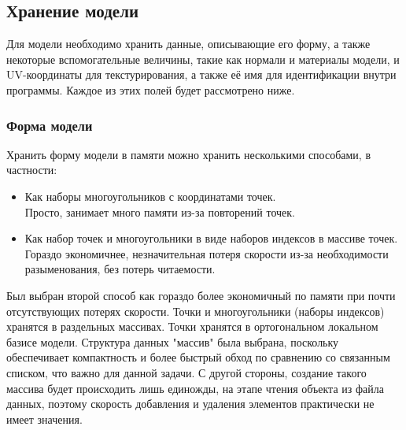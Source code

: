 \documentclass[a4paper,12pt]{report}
\begin{document}
\subsection{Хранение модели}
Для модели необходимо хранить данные, описывающие его форму, а также некоторые вспомогательные величины, такие как нормали и материалы модели, и UV-координаты для текстурирования, а также её имя для идентификации внутри программы. Каждое из этих полей будет рассмотрено ниже.

\subsubsection{Форма модели}
Хранить форму модели в памяти можно хранить несколькими способами, в частности:
\begin{itemize}
\item Как наборы многоугольников с координатами точек. \\
Просто, занимает много памяти из-за повторений точек.
\item Как набор точек и многоугольники в виде наборов индексов в массиве точек. \\
Гораздо экономичнее, незначительная потеря скорости из-за необходимости разыменования, без потерь читаемости.
\end{itemize}
Был выбран второй способ как гораздо более экономичный по памяти при почти отсутствующих потерях скорости. Точки и многоугольники (наборы индексов) хранятся в раздельных массивах. Точки хранятся в ортогональном локальном базисе модели. Структура данных "массив" была выбрана, поскольку обеспечивает компактность и более быстрый обход по сравнению со связанным списком, что важно для данной задачи. С другой стороны, создание такого массива будет происходить лишь единожды, на этапе чтения объекта из файла данных, поэтому скорость добавления и удаления элементов практически не имеет значения.
\end{document}
